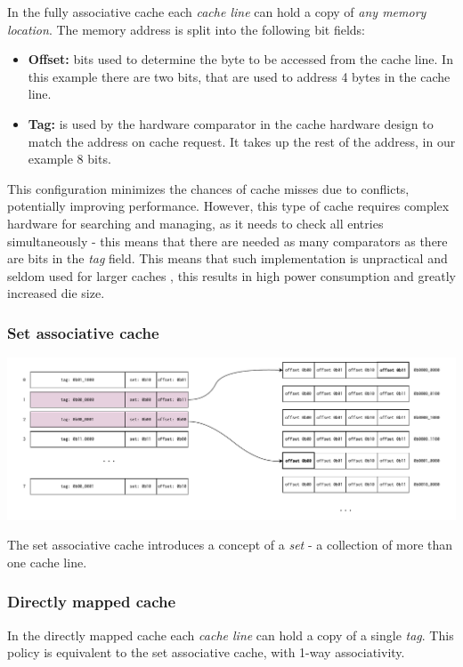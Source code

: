 \noindent In the fully associative cache each \textit{cache line} can hold a copy of \textit{any memory location}. The memory address is split into the following bit fields:

\begin{itemize}
	\item \textbf{Offset:} bits used to determine the byte to be accessed from the cache line. In this example there are two bits, that are used to address 4 bytes in the cache line.
	\item \textbf{Tag:} is used by the hardware comparator in the cache hardware design to match the address on cache request. It takes up the rest of the address, in our example 8 bits.
\end{itemize}


\noindent This configuration minimizes the chances of cache misses due to conflicts, potentially improving performance. However, this type of cache requires complex hardware for
searching and managing, as it needs to check all entries simultaneously - this means that there are needed as many comparators as there are bits in the \textit{tag} field.
This means that such implementation is unpractical and seldom used for larger caches \cite{whatevery}, this results in high power consumption and greatly increased die size.

\subsubsection{Set associative cache}
\begin{center}
	\centering
	\includegraphics[width=\textwidth]{figures/02-background/set_ass_mem.pdf}
	\label{fig:set_ass_mem}
\end{center}

\noindent The set associative cache introduces a concept of a \textit{set} - a collection of more than one cache line.

\subsubsection{Directly mapped cache}
In the directly mapped cache each \textit{cache line} can hold a copy of a single \textit{tag}. This policy is equivalent to the set associative cache, with 1-way associativity.

